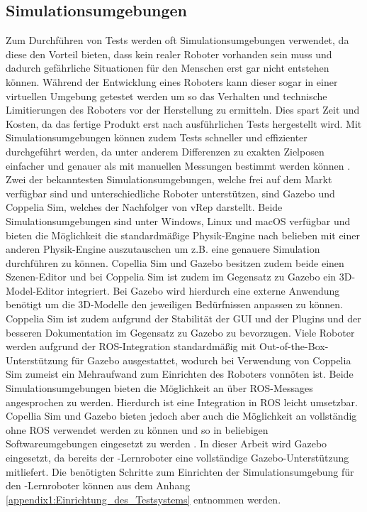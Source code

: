 
\subsection{Simulationsumgebungen}
Zum Durchführen von Tests werden oft Simulationsumgebungen verwendet, da diese den Vorteil bieten, dass kein realer Roboter vorhanden sein muss und dadurch gefährliche Situationen für den Menschen erst gar nicht entstehen können. Während der Entwicklung eines Roboters kann dieser sogar in einer virtuellen Umgebung getestet werden um so das Verhalten und technische Limitierungen des Roboters vor der Herstellung zu ermitteln. Dies spart Zeit und Kosten, da das fertige Produkt erst nach ausführlichen Tests hergestellt wird. Mit Simulationsumgebungen können zudem Tests schneller und effizienter durchgeführt werden, da unter anderem Differenzen zu exakten Zielposen einfacher und genauer als mit manuellen Messungen bestimmt werden können \cite{gazebo_nodate}. Zwei der bekanntesten Simulationsumgebungen, welche frei auf dem Markt verfügbar sind und unterschiedliche Roboter unterstützen, sind Gazebo und Coppelia Sim, welches der Nachfolger von vRep darstellt. Beide Simulationsumgebungen sind unter Windows, Linux und macOS verfügbar und bieten die Möglichkeit die standardmäßige Physik-Engine nach belieben mit einer anderen Physik-Engine auszutauschen um z.B. eine genauere Simulation durchführen zu können. Copellia Sim und Gazebo besitzen zudem beide einen Szenen-Editor und bei Coppelia Sim ist zudem im Gegensatz zu Gazebo ein 3D-Model-Editor integriert. Bei Gazebo wird hierdurch eine externe Anwendung benötigt um die 3D-Modelle den jeweiligen Bedürfnissen anpassen zu können. Coppelia Sim ist zudem aufgrund der Stabilität der GUI und der Plugins und der besseren Dokumentation im Gegensatz zu Gazebo zu bevorzugen. Viele Roboter werden aufgrund der ROS-Integration standardmäßig mit Out-of-the-Box-Unterstützung für Gazebo ausgestattet, wodurch bei Verwendung von Coppelia Sim zumeist ein Mehraufwand zum Einrichten des Roboters vonnöten ist. Beide Simulationsumgebungen bieten die Möglichkeit an über ROS-Messages angesprochen zu werden. Hierdurch ist eine Integration in ROS leicht umsetzbar. Copellia Sim und Gazebo bieten jedoch aber auch die Möglichkeit an vollständig ohne ROS verwendet werden zu können und so in beliebigen Softwareumgebungen eingesetzt zu werden \cite{vrep_vs_gazebo_nodate}. In dieser Arbeit wird Gazebo eingesetzt, da bereits der -Lernroboter eine vollständige Gazebo-Unterstützung mitliefert. Die benötigten Schritte zum Einrichten der Simulationsumgebung für den -Lernroboter können aus dem Anhang \ref{appendix1:Einrichtung_des_Testsystems} entnommen werden.


